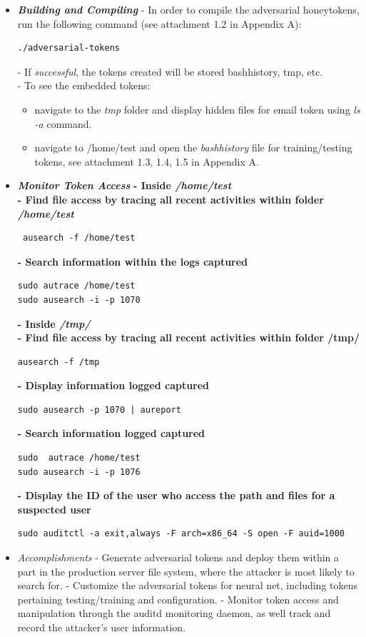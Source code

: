 \documentclass[grad,lot,lof,11pt,oneside,onehalfspace]{RUthesis}
\begin{document}
\begin{itemize}
		\item \textit{\textbf{Building and Compiling}}
		\newline
		- In order to compile the adversarial honeytokens, run the following command (see attachment 1.2 in Appendix A):
		\begin{lstlisting}
./adversarial-tokens
		\end{lstlisting}
		- If \textit{successful}, the tokens created will be stored bashhistory, tmp, etc.\\
		- To see the embedded tokens: 
		\begin{itemize}
		\item navigate to the \textit{tmp} folder and display hidden files for email token using \textit{ls -a} command.
		\item navigate to /home/test and open the \textit{bashhistory} file for training/testing tokens, see attachment 1.3, 1.4, 1.5 in Appendix A.\\ 
		\end{itemize}
		\item \textit{\textbf{Monitor Token Access}}
		\newline
\textbf{- Inside \textit{/home/test}\\
- Find file access  by tracing all recent
  activities within folder \textit{/home/test}}
		 \begin{lstlisting}
 ausearch -f /home/test 
		 \end{lstlisting}
\textbf{- Search information within the logs captured}
\begin{lstlisting}
sudo autrace /home/test 
sudo ausearch -i -p 1070
\end{lstlisting}
\textbf{- Inside \textit{/tmp/}\\
- Find file access  by tracing all recent activities within folder /tmp/}
\begin{lstlisting}
ausearch -f /tmp
\end{lstlisting}
\textbf{- Display information logged captured}
\begin{lstlisting}
sudo ausearch -p 1070 | aureport
\end{lstlisting}
\textbf{- Search information logged captured}
\begin{lstlisting}
sudo  autrace /home/test
sudo ausearch -i -p 1076
\end{lstlisting}
\textbf{- Display the ID of the user who access the path and files for a  suspected user}
\begin{lstlisting}
sudo auditctl -a exit,always -F arch=x86_64 -S open -F auid=1000
\end{lstlisting}
\item \textit{Accomplishments}\newline
- Generate adversarial tokens and deploy them within a part in the production server file system, where the attacker is most likely to search for.
\newline
- Customize the adversarial tokens for neural net, including tokens pertaining testing/training and configuration.
\newline
- Monitor token access and manipulation through the auditd monitoring daemon, as well track and record the attacker’s user information. 
\end{itemize}  
\end{document}
